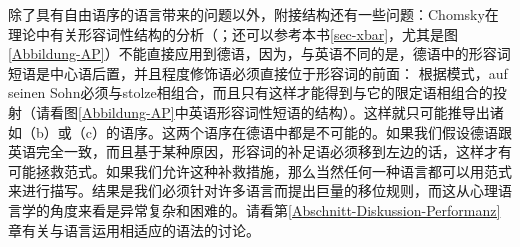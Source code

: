 除了具有自由语序的语言带来的问题以外，附接结构还有一些问题：Chomsky在\xbarc 理论中有关形容词性结构的分析（\citealp[]{Chomsky70a}；还可以参考本书\ref{sec-xbar}，尤其是图\vref{Abbildung-AP}）不能直接应用到德语，因为，与英语不同的是，德语中的形容词短语是中心语后置，并且程度修饰语必须直接位于形容词的前面：
\eal
{}
\zl
根据\xbarc 模式，auf seinen Sohn必须与stolze相组合，而且只有这样才能得到与它的限定语相组合的\abarc 投射（请看图\vref{Abbildung-AP}中英语形容词性短语的结构）。这样就只可能推导出诸如（b）或（c）的语序。这两个语序在德语中都是不可能的。如果我们假设德语跟英语完全一致，而且基于某种原因，形容词的补足语必须移到左边的话，这样才有可能拯救\xbarc 范式。如果我们允许这种补救措施，那么当然任何一种语言都可以用\xbarc 范式来进行描写。结果是我们必须针对许多语言而提出巨量的移位规则，而这从心理语言学的角度来看是异常复杂和困难的。请看第\ref{Abschnitt-Diskussion-Performanz}章有关与语言运用相适应的语法的讨论。 


